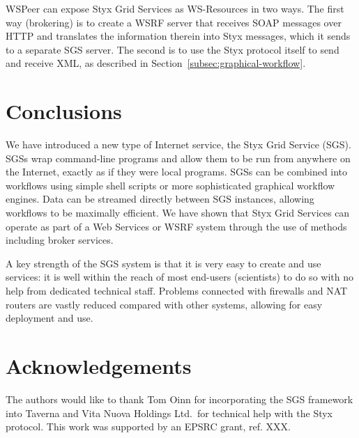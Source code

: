 \documentclass{llncs}
\begin{document}
WSPeer can expose Styx Grid Services as WS-Resources in two ways.  The first way (brokering) is to create a WSRF server that receives SOAP messages over HTTP and translates the information therein into Styx messages, which it sends to a separate SGS server.  The second is to use the Styx protocol itself to send and receive XML, as described in Section~\ref{subsec:graphical-workflow}.


\section{Conclusions}
We have introduced a new type of Internet service, the Styx Grid Service (SGS).  SGSs wrap command-line programs and allow them to be run from anywhere on the Internet, exactly as if they were local programs.  SGSs can be combined into workflows using simple shell scripts or more sophisticated graphical workflow engines.  Data can be streamed directly between SGS instances, allowing workflows to be maximally efficient.  We have shown that Styx Grid Services can operate as part of a Web Services or WSRF system through the use of methods including broker services.

A key strength of the SGS system is that it is very easy to create and use services: it is well within the reach of most end-users (scientists) to do so with no help from dedicated technical staff.  Problems connected with firewalls and NAT routers are vastly reduced compared with other systems, allowing for easy deployment and use.
%

\section*{Acknowledgements}
The authors would like to thank Tom Oinn for incorporating the SGS framework into Taverna and Vita Nuova Holdings Ltd.\ for technical help with the Styx protocol.  This work was supported by an EPSRC grant, ref. XXX.
%
%


\end{document}
